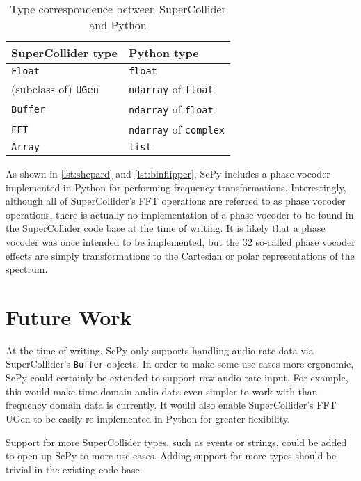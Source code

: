 \documentclass{article}
\begin{document}
\begin{table}[ht]
    \caption{Type correspondence between SuperCollider and Python}
    \begin{center}
        \begin{tabular}{ll}
            \toprule
            SuperCollider type & Python type \\
            \midrule
            \texttt{Float} & \texttt{float} \\
            (subclass of) \texttt{UGen} & \texttt{ndarray} of \texttt{float} \\
            \texttt{Buffer} & \texttt{ndarray} of \texttt{float} \\
            \texttt{FFT} & \texttt{ndarray} of \texttt{complex} \\
            \texttt{Array} & \texttt{list} \\
            \bottomrule
        \end{tabular}
    \end{center}
\end{table}

As shown in \autoref{lst:shepard} and \autoref{lst:binflipper}, ScPy includes a phase vocoder
implemented in Python for performing frequency transformations. Interestingly, although all of
SuperCollider's FFT operations are referred to as phase vocoder operations, there is actually no
implementation of a phase vocoder to be found in the SuperCollider code base at the time of
writing. It is likely that a phase vocoder was once intended to be implemented, but the 32
so-called phase vocoder effects are simply transformations to the Cartesian or polar
representations of the spectrum.

\section{Future Work}

At the time of writing, ScPy only supports handling audio rate data via SuperCollider's
\texttt{Buffer} objects. In order to make some use cases more ergonomic, ScPy could certainly be
extended to support raw audio rate input. For example, this would make time domain audio data even
simpler to work with than frequency domain data is currently. It would also enable SuperCollider's
FFT UGen to be easily re-implemented in Python for greater flexibility.

Support for more SuperCollider types, such as events or strings, could be added to open up ScPy to
more use cases. Adding support for more types should be trivial in the existing code base.
\end{document}
